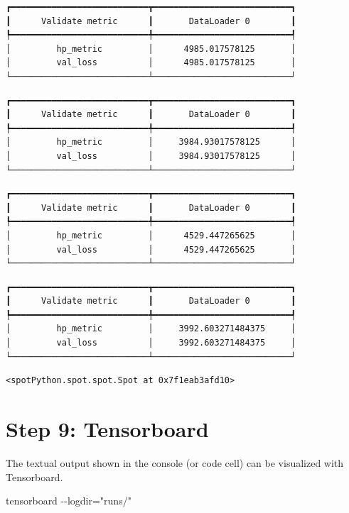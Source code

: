 \documentclass[
  letterpaper,
  DIV=11,
  numbers=noendperiod]{scrreprt}
\newenvironment{Shaded}{\begin{snugshade}}{\end{snugshade}}
\newcommand{\NormalTok}[1]{\textcolor[rgb]{0.00,0.23,0.31}{#1}}
\begin{document}
\begin{verbatim}
┏━━━━━━━━━━━━━━━━━━━━━━━━━━━┳━━━━━━━━━━━━━━━━━━━━━━━━━━━┓
┃      Validate metric      ┃       DataLoader 0        ┃
┡━━━━━━━━━━━━━━━━━━━━━━━━━━━╇━━━━━━━━━━━━━━━━━━━━━━━━━━━┩
│         hp_metric         │      4985.017578125       │
│         val_loss          │      4985.017578125       │
└───────────────────────────┴───────────────────────────┘
\end{verbatim}

\begin{verbatim}
┏━━━━━━━━━━━━━━━━━━━━━━━━━━━┳━━━━━━━━━━━━━━━━━━━━━━━━━━━┓
┃      Validate metric      ┃       DataLoader 0        ┃
┡━━━━━━━━━━━━━━━━━━━━━━━━━━━╇━━━━━━━━━━━━━━━━━━━━━━━━━━━┩
│         hp_metric         │     3984.93017578125      │
│         val_loss          │     3984.93017578125      │
└───────────────────────────┴───────────────────────────┘
\end{verbatim}

\begin{verbatim}
┏━━━━━━━━━━━━━━━━━━━━━━━━━━━┳━━━━━━━━━━━━━━━━━━━━━━━━━━━┓
┃      Validate metric      ┃       DataLoader 0        ┃
┡━━━━━━━━━━━━━━━━━━━━━━━━━━━╇━━━━━━━━━━━━━━━━━━━━━━━━━━━┩
│         hp_metric         │      4529.447265625       │
│         val_loss          │      4529.447265625       │
└───────────────────────────┴───────────────────────────┘
\end{verbatim}

\begin{verbatim}
┏━━━━━━━━━━━━━━━━━━━━━━━━━━━┳━━━━━━━━━━━━━━━━━━━━━━━━━━━┓
┃      Validate metric      ┃       DataLoader 0        ┃
┡━━━━━━━━━━━━━━━━━━━━━━━━━━━╇━━━━━━━━━━━━━━━━━━━━━━━━━━━┩
│         hp_metric         │     3992.603271484375     │
│         val_loss          │     3992.603271484375     │
└───────────────────────────┴───────────────────────────┘
\end{verbatim}

\begin{verbatim}
<spotPython.spot.spot.Spot at 0x7f1eab3afd10>
\end{verbatim}

\section{Step 9: Tensorboard}\label{sec-tensorboard-32}

The textual output shown in the console (or code cell) can be visualized
with Tensorboard.

\begin{Shaded}
\begin{Highlighting}[]
\NormalTok{tensorboard {-}{-}logdir="runs/"}
\end{Highlighting}
\end{Shaded}
\end{document}
